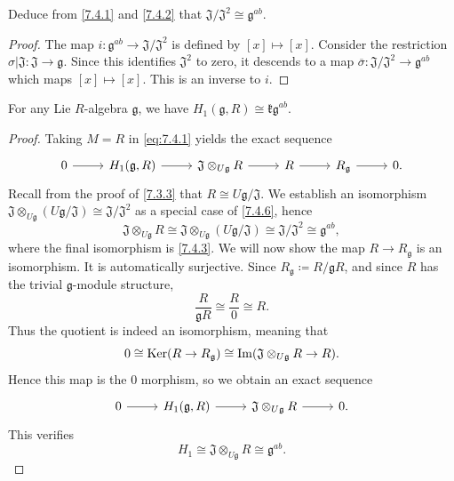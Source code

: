 \begin{exercise}\label{7.4.3}
Deduce from \cref{7.4.1} and \cref{7.4.2} that $\mathfrak{J} /\mathfrak{J} ^2 \cong \mathfrak{g} ^{ab} $. 
\end{exercise}
\begin{proof}
	The map $i : \mathfrak{g} ^{ab}  \to \mathfrak{J} /\mathfrak{J} ^2$ is defined by $[x]\mapsto [x]$. Consider the restriction $\sigma |\mathfrak{J} : \mathfrak{J}  \to \mathfrak{g} $. Since this identifies $\mathfrak{J} ^2$ to zero, it descends to a map $\overline{\sigma } : \mathfrak{J} /\mathfrak{J} ^2 \to \mathfrak{g} ^{ab} $ which maps $[x]\mapsto [x]$. This is an inverse to $i$.
\end{proof}
\begin{theorem}\label{7.4.4}
	For any Lie $R$-algebra $\mathfrak{g} $, we have $H_1(\mathfrak{g} ,R)\cong \mathfrak{kg} ^{ab} $.
\end{theorem}
\begin{proof}
	Taking $M=R$ in \eqref{eq:7.4.1} yields the exact sequence
	\[\begin{tikzcd}[row sep = 2.5em, column sep = 2.5em]
	0\ar[r]  & H_1(\mathfrak{g} ,R)\ar[r]  & \mathfrak{J} \otimes _{U\mathfrak{g} } R\ar[r]  & R\ar[r]  & R_\mathfrak{g} \ar[r]  & 0.
	\end{tikzcd}\]
	Recall from the proof of \cref{7.3.3} that $R \cong U\mathfrak{g} /\mathfrak{J} $. We establish an isomorphism $\mathfrak{J} \otimes _{U\mathfrak{g} } (U\mathfrak{g} /\mathfrak{J} )\cong \mathfrak{J} /\mathfrak{J} ^2$ as a special case of \cref{7.4.6}, hence
	\[
		\mathfrak{J} \otimes_{U\mathfrak{g} } R \cong \mathfrak{J} \otimes _{U\mathfrak{g} } (U\mathfrak{g} /\mathfrak{J} )\cong \mathfrak{J} /\mathfrak{J} ^2 \cong \mathfrak{g} ^{ab} ,
	\]
	where the final isomorphism is \cref{7.4.3}. We will now show the map $R\to R_\mathfrak{g} $ is an isomorphism. It is automatically surjective. Since $R_\mathfrak{g} \coloneqq R/\mathfrak{g} R$, and since $R$ has the trivial $\mathfrak{g} $-module structure,
	\[
		\frac{R}{\mathfrak{g} R} \cong \frac{R}{0} \cong R
	.\]
	Thus the quotient is indeed an isomorphism, meaning that
	\[
		0 \cong \operatorname{Ker} (R\to R_\mathfrak{g} ) \cong \operatorname{Im} (\mathfrak{J} \otimes _{U\mathfrak{g} } R\to R)
	.\]
	Hence this map is the 0 morphism, so we obtain an exact sequence
	\[\begin{tikzcd}[row sep = 2.5em, column sep = 2.5em]
	0\ar[r]  & H_1(\mathfrak{g} ,R)\ar[r]  & \mathfrak{J} \otimes _{U\mathfrak{g} } R\ar[r]  & 0.
	\end{tikzcd}\]
	This verifies
	\[
		H_1 \cong \mathfrak{J} \otimes _{U\mathfrak{g} } R \cong \mathfrak{g} ^{ab} 
	.\]
\end{proof}
